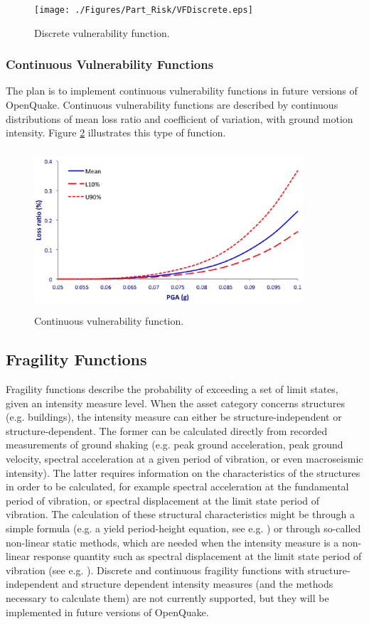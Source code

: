 \begin{figure}[ht]
\centering
\texttt{[image: ./Figures/Part\_Risk/VFDiscrete.eps]}
\caption{Discrete vulnerability function.}
\label{fig:VFDiscrete}
\end{figure}

\subsubsection{Continuous Vulnerability Functions}
The plan is to implement continuous vulnerability functions in future versions of OpenQuake. Continuous vulnerability functions are described by continuous distributions of mean loss ratio and coefficient of variation, with ground motion intensity. Figure \ref{fig:VFContinuous} illustrates this type of function.

\begin{figure}[ht]
\centering
\includegraphics[width=10cm,height=6cm]{./Figures/Part_Risk/VFContinuous}
\caption{Continuous vulnerability function.}
\label{fig:VFContinuous}
\end{figure}

\subsection{Fragility Functions}
Fragility functions describe the probability of exceeding a set of limit states, given an intensity measure level. When the asset category concerns structures (e.g. buildings), the intensity measure can either be structure-independent or structure-dependent. The former can be calculated directly from recorded measurements of ground shaking (e.g. peak ground acceleration, peak ground velocity, spectral acceleration at a given period of vibration, or even macroseismic intensity). The latter requires information on the characteristics of the structures in order to be calculated, for example spectral acceleration at the fundamental period of vibration, or spectral displacement at the limit state period of vibration. The calculation of these structural characteristics might be through a simple formula (e.g. a yield period-height equation, see e.g. \citet{CrowleyPinho2004} ) or through so-called non-linear static methods, which are needed when the intensity measure is a non-linear response quantity such as spectral displacement at the limit state period of vibration (see e.g. \citet{FEMA440ATC2005}).
Discrete and continuous fragility functions with structure-independent and structure dependent intensity measures (and the methods necessary to calculate them) are not currently supported, but they will be implemented in future versions of OpenQuake. 

